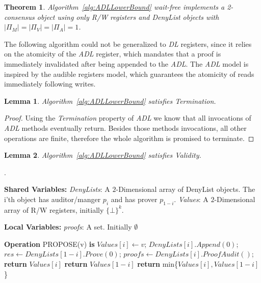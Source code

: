 \documentclass[11pt]{article}
\newtheorem{theorem}{Theorem}
\newtheorem{lemma}{Lemma}
\theoremstyle{definition}
\begin{document}
\begin{theorem}\label{thm:ADLLowerBound}
        Algorithm~\ref{alg:ADLLowerBound} wait-free implements a 2-consensus object using only R/W registers and DenyList objects with $\vert\Pi_M\vert=\vert\Pi_V\vert=\vert\Pi_A\vert=1$.
\end{theorem}

\noindent The following algorithm could not be generalized to \textit{DL} registers, since it relies on the atomicity of the \textit{ADL} register, which mandates that a proof is immediately invalidated after being appended to the \textit{ADL}. The \textit{ADL} model is inspired by the audible registers model, which guarantees the atomicity of reads immediately following writes.

\begin{lemma}
  Algorithm~\ref{alg:ADLLowerBound} satisfies Termination.
\end{lemma}

\begin{proof}
Using the \textit{Termination} property of \textit{ADL} we know that all invocations of \textit{ADL} methods eventually return. Besides those methods invocations, all other operations are finite, therefore the whole algorithm is promised to terminate.
\end{proof}
\begin{lemma}
  Algorithm~\ref{alg:ADLLowerBound} satisfies Validity.
\end{lemma}
\begin{algorithm}
    \caption{A $2$-consensus implementation using DenyList objects with $\vert\Pi_M\vert=\vert\Pi_V\vert=\vert\Pi_A\vert=1$.}.
    \label{alg:ADLLowerBound}
    \begin{algorithmic}[1]
    \Statex \textbf{Shared Variables:}
    \Statex \hspace{1em} \textit{DenyLists}: A $2$-Dimensional array of DenyList objects. The i'th object has auditor/manger $p_i$ and has prover $p_{1-i}$.
    \Statex \hspace{1em} \textit{Values}: A $2$-Dimensional array of R/W registers, initially $\{\bot\}^k$.

    \Statex
    \Statex \textbf{Local Variables:} \hfill {}
    \Statex \hspace{1em}\textit{proofs}: A set. Initially $\emptyset$

    \Statex
    \Statex \textbf{Operation} PROPOSE(v) \textbf{is}
    \State $Values[i] \leftarrow v$;
    \State $DenyLists[i].Append(0)$;
    \State $res\leftarrow DenyLists[1-i].Prove(0)$;
    \State $proofs\leftarrow DenyLists[i].ProofAudit()$;
        \State\textbf{return} $Values[i]$
    \EndIf
        \State\textbf{return} $Values[1-i]$
    \EndIf
    \State \textbf{return} min\{$Values[i],Values[1-i]$\}
    \end{algorithmic}
\end{algorithm}
\end{document}
